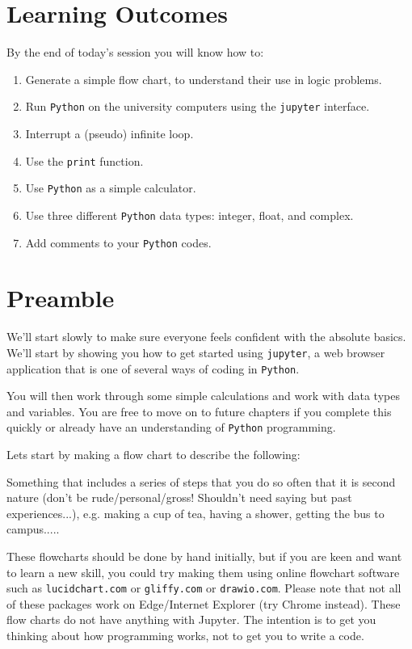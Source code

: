 \section{Learning Outcomes} 
\label{W1LO}

\noindent By the end of today's session you will know how to:
\begin{enumerate} 
\item Generate a simple flow chart, to understand their use in logic problems.
\item Run \texttt{Python} on the university computers using the \texttt{jupyter} interface.
\item Interrupt a (pseudo) infinite loop.
\item Use the {\tt print} function.
\item Use \texttt{Python} as a simple calculator.
\item Use three different \texttt{Python} data types: integer, float, and complex.
\item Add comments to your \texttt{Python} codes.
\end{enumerate}

\section{Preamble} 
\label{sec:preamle1}

We'll start slowly to make sure everyone feels confident with the absolute basics. We'll start by showing you how to get started using \texttt{jupyter}, a web browser application that is one of several ways of coding in \texttt{Python}.

You will then work through some simple calculations and work with data types and variables. You are free to move on to future chapters if you complete this quickly or already have an understanding of \texttt{Python} programming.

Lets start by making a flow chart to describe the following:

Something that includes a series of steps that you do so often that it is second nature (don't be rude/personal/gross! Shouldn't need saying but past experiences...), e.g. making a cup of tea, having a shower, getting the bus to campus.....

These flowcharts should be done by hand initially, but if you are keen and want to learn a new skill, you could try making them using online flowchart software such as {\tt lucidchart.com} or {\tt gliffy.com} or {\tt drawio.com}. Please note that not all of these packages work on Edge/Internet Explorer (try Chrome instead). These flow charts do not have anything with Jupyter. The intention is to get you thinking about how programming works, not to get you to write a code.

